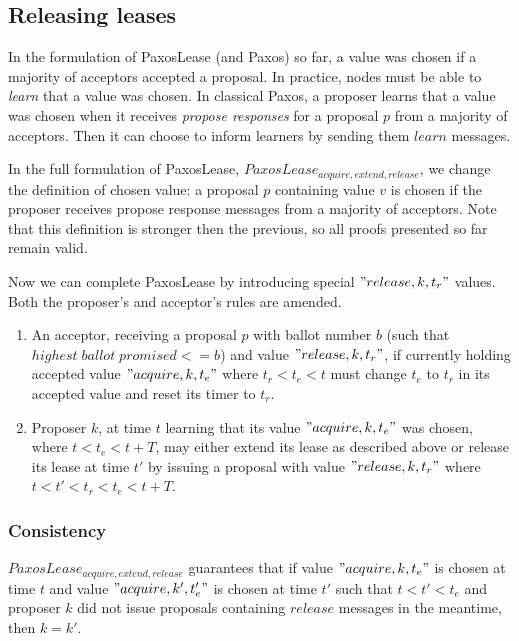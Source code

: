 \documentclass[12pt]{amsart}
\begin{document}
\subsection{ Releasing leases }

In the formulation of PaxosLease (and Paxos) so far, a value was chosen if a majority of acceptors accepted a proposal. In practice, nodes must be able to \emph{learn} that a value was chosen. In classical Paxos, a proposer learns that a value was chosen when it receives \emph{propose responses} for a proposal $p$ from a majority of acceptors. Then it can choose to inform learners by sending them $learn$ messages.

In the full formulation of PaxosLease, $PaxosLease_{acquire, extend, release}$, we change the definition of chosen value: a proposal $p$ containing value $v$ is chosen if the proposer receives propose response messages from a majority of acceptors.
Note that this definition is stronger then the previous, so all proofs presented so far remain valid.

Now we can complete PaxosLease by introducing special $"release, k, t_r"$ values. Both the proposer's and acceptor's rules are amended.

\begin{enumerate}

\item An acceptor, receiving a proposal $p$ with ballot number $b$ (such that $highest \; ballot \; promised <= b$) and value $"release, k, t_r"$, if currently holding accepted value $"acquire, k, t_e"$ where $t_r < t_e < t$ must change $t_e$ to $t_r$ in its accepted value and reset its timer to $t_r$.

\item Proposer $k$, at time $t$ learning that its value $"acquire, k, t_e"$ was chosen, where $t < t_e < t + T$, may either extend its lease as described above or release its lease at time $t'$ by issuing a proposal with value $"release, k, t_r"$ where $t < t' <  t_r < t_e < t + T$.

\end{enumerate}

\subsubsection{ Consistency } $PaxosLease_{acquire, extend, release}$ guarantees that if value $"acquire, k, t_e"$ is chosen at time $t$ and value $"acquire, k', t_e'"$ is chosen at time $t'$ such that $t < t' < t_e$ and proposer $k$ did not issue proposals containing $release$ messages in the meantime, then $k = k'$.
\end{document}
